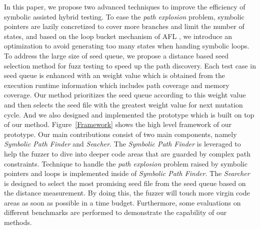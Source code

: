 In this paper, we propose two advanced techniques to improve the efficiency of symbolic assisted hybrid testing.
 To ease the \textit{path explosion} problem, symbolic pointers are lazily concretized to cover more branches and limit the number of states,
 and based on the loop bucket mechanism of AFL \cite{online:afl}, 
 we introduce an optimization to avoid generating too many states when handing symbolic loops. 
 To address the large size of seed queue, 
 we propose a distance based seed selection method for fuzz testing to speed up the path discovery. 
 Each test case in seed queue is enhanced with an weight value 
 which is obtained from the execution runtime information which includes path coverage and memory coverage.
 Our method prioritizes the seed queue according to this weight value and 
 then selects the seed file with the greatest weight value for next mutation cycle.
 And we also designed and implemented the prototype which is built on top of our method. 
 Figure~\ref{Framework} shows the high level framework of our prototype.
 Our main contributions consist of two main components, namely \emph{Symbolic Path Finder} and \emph{Seacher}. 
 The \emph{Symbolic Path Finder} is leveraged to help the fuzzer to dive into deeper code areas 
 that are guarded by complex path constraints. 
 Technique to handle the \textit{path explosion} problem 
 raised by symbolic pointers and loops 
 is implemented inside of \emph{Symbolic Path Finder}. 
 The \emph{Searcher} is designed to select the most promising seed file 
 from the seed queue based on the distance measurement. 
 By doing this, the fuzzer will touch more virgin code areas as soon as possible in a time budget. 
 Furthermore, some evaluations on different benchmarks are performed to demonstrate the capability of our methods.

